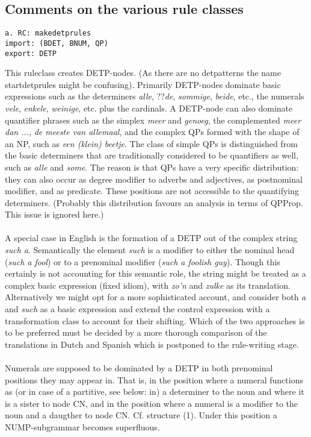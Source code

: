 \subsection{Comments on the various rule classes }
\begin{verbatim}
a. RC: makedetprules
import: (BDET, BNUM, QP)
export: DETP 
\end{verbatim}
This ruleclass creates DETP-nodes. (As there are no detpatterns the
name startdetprules might be confusing). Primarily DETP-nodes 
dominate basic expressions
such as the determiners {\em alle}, ??{\em de}, {\em sommige}, {\em beide}, 
etc., the numerals
{\em vele}, 
{\em enkele}, {\em weinige}, etc. plus the cardinals. A DETP-node can also
dominate quantifier phrases such as the simplex {\em meer} and {\em genoeg}, 
the
complemented 
{\em meer dan ...}, {\em de meeste van allemaal}, and the complex QPs
formed with the shape of an NP, such as {\em een (klein) beetje}. The class of
simple QPs is distinguished from the basic determiners that are traditionally
considered 
to be quantifiers as well, such as {\em alle} and {\em some}. The reason is
that QPs have a very specific distribution: they can also occur as degree
modifier to adverbs and adjectives, as postnominal modifier, and as predicate.
These positions are not accessible to the quantifying determiners. (Probably
this distribution favours an analysis in terms of QPProp. This issue is ignored
here.)
\\ \\
A special case in English is the formation of a DETP out of the complex string
{\em such a}. Semantically the element {\em such} is a modifier to either the
nominal head ({\em such a fool}) or to a prenominal modifier ({\em  such a
foolish guy}). Though this certainly is not accounting for this semantic role,
the string might be treated as a complex basic expression (fixed idiom), 
with {\em zo'n}
and {\em zulke} as its translation. Alternatively we might opt for a more 
sophisticated account, and consider both {\em a} and {\em such} as a basic
expression and extend the control expression with 
a transformation class to account for their shifting. Which of the two 
approaches is to be preferred must be decided by a more thorough comparison
of the translations in Dutch and Spanish which is postponed to the rule-writing 
stage. 
\\ \\ 
Numerals are supposed to be dominated by a DETP in both prenominal positions
they may appear in. That is, in the position where a numeral functions as
(or in case of a partitive, see below: in) a determiner to the noun and where
it is a sister to node CN, and in the position where a numeral is a modifier to
the noun and a daugther to node CN. Cf. structure (1). Under this
position a NUMP-subgrammar becomes superfluous.

